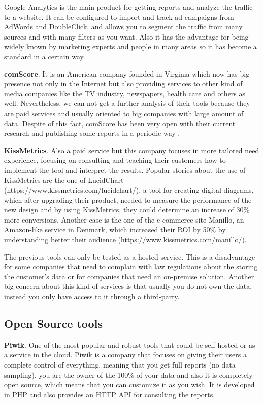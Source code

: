 \documentclass[preprint,12pt,3p]{elsarticle}
\begin{document}
Google Analytics is the main product for getting reports and analyze the traffic to a website. It can be configured to import and track ad campaigns from AdWords and DoubleClick, and allows you to segment the traffic from many sources and with many filters as you want. Also it has the advantage for being widely known by marketing experts and people in many areas so it has become a standard in a certain way.

\textbf{comScore}.
It is an American company founded in Virginia which now has big presence not only in the Internet but also providing services to other kind of media companies like the TV industry, newspapers, health care and others as well. Nevertheless, we can not get a further analysis of their tools because they are paid services and usually oriented to big companies with large amount of data. Despite of this fact, comScore has been very open with their current research and publishing some reports in a periodic way \cite{comScoreIVT, BrianPugh2012}.

\textbf{KissMetrics}.
Also a paid service but this company focuses in more tailored need experience, focusing on consulting and teaching their customers how to implement the tool and interpret the results. Popular stories about the use of KissMetrics are the one of LucidChart (https://www.kissmetrics.com/lucidchart/), a tool for creating digital diagrams, which after upgrading their product, needed to measure the performance of the new design and by using KissMetrics, they could determine an increase of 30\% more conversions. Another case is the one of the e-commerce site Manillo, an Amazon-like service in Denmark, which increased their ROI by 50\% by understanding better their audience (https://www.kissmetrics.com/manillo/).


The previous tools can only be tested as a hosted service. This is a disadvantage for some companies that need to complain with law regulations about the storing the customer's data or for companies that need an on-premise solution. Another big concern about this kind of services is that usually you do not own the data, instead you only have access to it through a third-party.

\subsection{Open Source tools}                                                                                               
\textbf{Piwik}.
One of the most popular and robust tools that could be self-hosted or as a service in the cloud. Piwik is a company that focuses on giving their users a complete control of everything, meaning that you get full reports (no data sampling), you are the owner of the 100\% of your data and also it is completely open source, which means that you can customize it as you wish. It is developed in PHP and also provides an HTTP API for consulting the reports.
\end{document}
